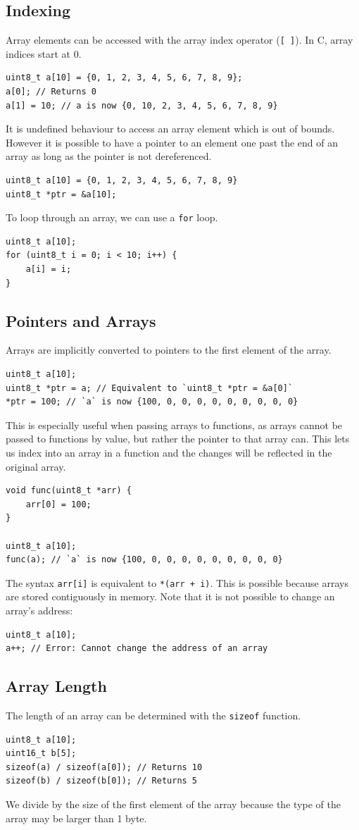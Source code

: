 \documentclass[a4paper]{report}
\begin{document}
\subsection{Indexing}
Array elements can be accessed with the array index operator (\texttt{[ ]}).
In C, array indices start at 0.
\begin{verbatim}
uint8_t a[10] = {0, 1, 2, 3, 4, 5, 6, 7, 8, 9};
a[0]; // Returns 0
a[1] = 10; // a is now {0, 10, 2, 3, 4, 5, 6, 7, 8, 9}
\end{verbatim}
It is undefined behaviour to access an array element which is out of bounds.
However it is possible to have a pointer to an element one past the end of an array
as long as the pointer is not dereferenced.
\begin{verbatim}
uint8_t a[10] = {0, 1, 2, 3, 4, 5, 6, 7, 8, 9}
uint8_t *ptr = &a[10];
\end{verbatim}
To loop through an array, we can use a \texttt{for} loop.
\begin{verbatim}
uint8_t a[10];
for (uint8_t i = 0; i < 10; i++) {
    a[i] = i;
}
\end{verbatim}
\subsection{Pointers and Arrays}
Arrays are implicitly converted to pointers to the first element of the array.
\begin{verbatim}
uint8_t a[10];
uint8_t *ptr = a; // Equivalent to `uint8_t *ptr = &a[0]`
*ptr = 100; // `a` is now {100, 0, 0, 0, 0, 0, 0, 0, 0, 0}
\end{verbatim}
This is especially useful when passing arrays to functions, as
arrays cannot be passed to functions by value, but rather the
pointer to that array can.
This lets us index into an array in a function
and the changes will be reflected in the original array.
\begin{verbatim}
void func(uint8_t *arr) {
    arr[0] = 100;
}

uint8_t a[10];
func(a); // `a` is now {100, 0, 0, 0, 0, 0, 0, 0, 0, 0}
\end{verbatim}
The syntax \texttt{arr[i]} is equivalent to \texttt{*(arr + i)}.
This is possible because arrays are stored contiguously in memory.
Note that it is not possible to change an array's address:
\begin{verbatim}
uint8_t a[10];
a++; // Error: Cannot change the address of an array
\end{verbatim}
\subsection{Array Length}
The length of an array can be determined with the \texttt{sizeof} function.
\begin{verbatim}
uint8_t a[10];
uint16_t b[5];
sizeof(a) / sizeof(a[0]); // Returns 10
sizeof(b) / sizeof(b[0]); // Returns 5
\end{verbatim}
We divide by the size of the first element of the array because
the type of the array may be larger than 1 byte.
\end{document}
